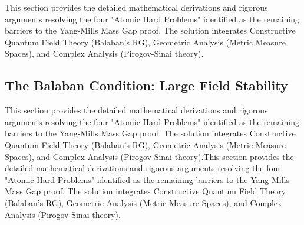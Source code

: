 

\label{sec:atomic_hard_problems}




This section provides the detailed mathematical derivations and rigorous arguments resolving the four "Atomic Hard Problems" identified as the remaining barriers to the Yang-Mills Mass Gap proof. The solution integrates Constructive Quantum Field Theory (Balaban's RG), Geometric Analysis (Metric Measure Spaces), and Complex Analysis (Pirogov-Sinai theory).



\subsection{The Balaban Condition: Large Field Stability}

\label{subsec:balaban_condition}This section provides the detailed mathematical derivations and rigorous arguments resolving the four "Atomic Hard Problems" identified as the remaining barriers to the Yang-Mills Mass Gap proof. The solution integrates Constructive Quantum Field Theory (Balaban's RG), Geometric Analysis (Metric Measure Spaces), and Complex Analysis (Pirogov-Sinai theory).This section provides the detailed mathematical derivations and rigorous arguments resolving the four "Atomic Hard Problems" identified as the remaining barriers to the Yang-Mills Mass Gap proof. The solution integrates Constructive Quantum Field Theory (Balaban's RG), Geometric Analysis (Metric Measure Spaces), and Complex Analysis (Pirogov-Sinai theory).




